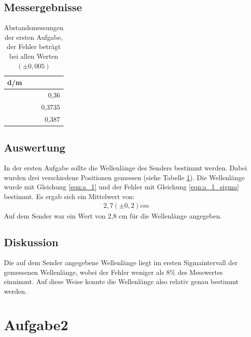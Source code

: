 \documentclass[12pt]{scrartcl}
\begin{document}
\subsection{Messergebnisse}
\begin{table}[H]
\caption{Abstandsmessungen der ersten Aufgabe, der Fehler beträgt bei allen Werten $(\pm 0,005)$}
\centering
\begin{tabular}{|r|}
\hline
\multicolumn{1}{|l|}{d/m} \\ \hline
0,36 \\ \hline
0,3735 \\ \hline
0,387 \\ \hline
\end{tabular}
\label{tab:a_1}
\end{table}
\subsection{Auswertung}
In der ersten Aufgabe sollte die Wellenlänge des Senders bestimmt werden. Dabei wurden drei verschiedene Positionen gemessen (siehe Tabelle \ref{tab:a_1}). Die Wellenlänge wurde mit Gleichung \ref{eqn:a_1} und der Fehler mit Gleichung \ref{eqn:a_1_sigma} bestimmt. Es ergab sich ein Mittelwert von:
\begin{align*}
2,7 (\pm 0,2) cm
\end{align*}
Auf dem Sender war ein Wert von 2,8 cm für die Wellenlänge angegeben.
\subsection{Diskussion}
Die auf dem Sender angegebene Wellenlänge liegt im ersten Sigmaintervall der gemessenen Wellenlänge, wobei der Fehler weniger als 8\% des Messwertes einnimmt. Auf diese Weise konnte die Wellenlänge also relativ genau bestimmt werden.
\section{Aufgabe2}
\end{document}
